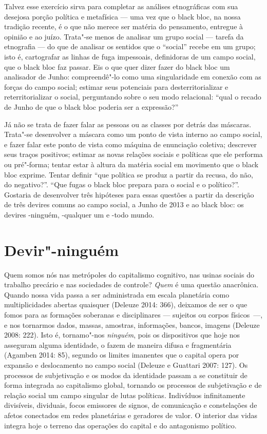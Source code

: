 Talvez esse exercício sirva para completar as análises etnográficas com
sua desejosa porção política e metafísica --- uma vez que o black bloc,
na nossa tradição recente, é o que não merece ser matéria do pensamento,
entregue à opinião e ao juízo. Trata"-se menos de analisar um grupo
social --- tarefa da etnografia --- do que de analisar os sentidos que o
``social'' recebe em um grupo; isto é, cartografar as linhas de fuga
impessoais, definidoras de um campo social, que o black bloc faz passar.
Eis o que quer dizer fazer do black bloc um analisador de Junho:
compreendê"-lo como uma singularidade em conexão com as forças do campo
social; estimar seus potenciais para desterritorializar e
reterritorializar o social, perguntando sobre o seu modo relacional:
``qual o recado de Junho de que o black bloc poderia ser a expressão?''

Já não se trata de fazer falar as pessoas ou as classes por detrás das
máscaras. Trata"-se desenvolver a máscara como um ponto de vista interno
ao campo social, e fazer falar este ponto de vista como máquina de
enunciação coletiva; descrever seus traços positivos; estimar as novas
relações sociais e políticas que ele performa ou pré"-forma; tentar estar
à altura da matéria social em movimento que o black bloc exprime. Tentar
definir ``que política se produz a partir da recusa, do não, do
negativo?''. ``Que fugas o black bloc prepara para o social e o
político?''. Gostaria de desenvolver três hipóteses para essas questões
a partir da descrição de três devires comuns ao campo social, a Junho de
2013 e ao black bloc: os devires -ninguém, -qualquer um e -todo mundo.

\section{Devir"-ninguém}

Quem somos nós nas metrópoles do capitalismo
cognitivo, nas usinas sociais do trabalho precário e nas sociedades de
controle? \emph{Quem} é uma questão anacrônica. Quando nossa vida passa
a ser administrada em escala planetária como multiplicidades abertas
quaisquer (Deleuze 2014: 366), deixamos de ser o que fomos para as
formações soberanas e disciplinares --- sujeitos ou corpos físicos~---, e
nos tornarmos dados, massas, amostras, informações, bancos, imagens
(Deleuze 2008: 222). Isto é, tornamo"-nos \emph{ninguém}, pois os
dispositivos que hoje nos asseguram alguma identidade, o fazem de
maneira difusa e fragmentária (Agamben 2014: 85), segundo os limites
imanentes que o capital opera por expansão e deslocamento no campo
social (Deleuze e Guattari 2007: 127). Os processos de subjetivação e
os modos da identidade passam a se constituir de forma integrada ao
capitalismo global, tornando os processos de subjetivação e de relação
social um campo singular de lutas políticas. Indivíduos infinitamente
divisíveis, dividuais, focos emissores de signos, de comunicação e
constelações de afetos conectados em redes planetárias e geradores de
valor. O interior das vidas integra hoje o terreno das operações do
capital e do antagonismo político.

